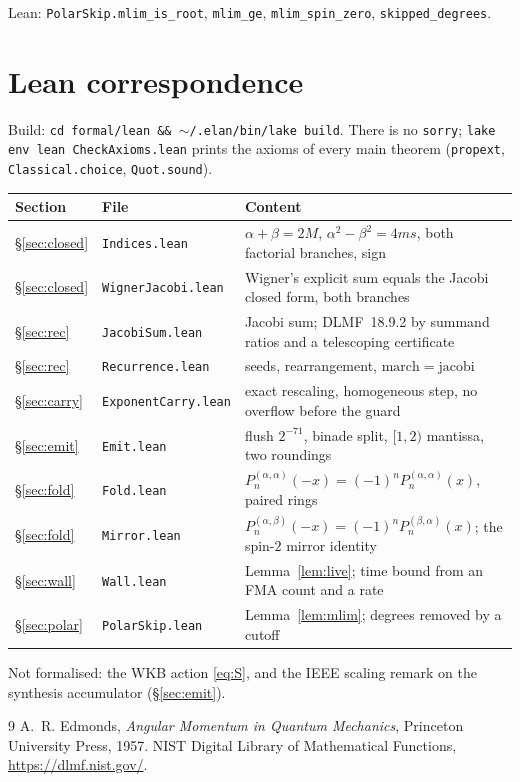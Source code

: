 \documentclass[11pt,a4paper]{article}
\numberwithin{equation}{section}
\begin{document}
Lean: \texttt{PolarSkip.mlim\_is\_root}, \texttt{mlim\_ge},
\texttt{mlim\_spin\_zero}, \texttt{skipped\_degrees}.

\appendix
\section{Lean correspondence}
\label{app:lean}

Build: \texttt{cd formal/lean \&\& $\sim$/.elan/bin/lake build}.
There is no \texttt{sorry}; \texttt{lake env lean CheckAxioms.lean} prints the
axioms of every main theorem (\texttt{propext}, \texttt{Classical.choice},
\texttt{Quot.sound}).

\begin{center}
\small
\begin{tabular}{@{}llp{7.4cm}@{}}
\toprule
Section & File & Content \\
\midrule
\S\ref{sec:closed}
  & \texttt{Indices.lean}
  & $\alpha+\beta=2M$, $\alpha^2-\beta^2=4ms$, both factorial branches, sign \\
\S\ref{sec:closed}
  & \texttt{WignerJacobi.lean}
  & Wigner's explicit sum equals the Jacobi closed form, both branches \\
\S\ref{sec:rec}
  & \texttt{JacobiSum.lean}
  & Jacobi sum; DLMF~18.9.2 by summand ratios and a telescoping certificate \\
\S\ref{sec:rec}
  & \texttt{Recurrence.lean}
  & seeds, rearrangement, $\mathrm{march}=\mathrm{jacobi}$ \\
\S\ref{sec:carry}
  & \texttt{ExponentCarry.lean}
  & exact rescaling, homogeneous step, no overflow before the guard \\
\S\ref{sec:emit}
  & \texttt{Emit.lean}
  & flush $2^{-71}$, binade split, $[1,2)$ mantissa, two roundings \\
\S\ref{sec:fold}
  & \texttt{Fold.lean}
  & $P_n^{(\alpha,\alpha)}(-x)=(-1)^n P_n^{(\alpha,\alpha)}(x)$, paired rings \\
\S\ref{sec:fold}
  & \texttt{Mirror.lean}
  & $P_n^{(\alpha,\beta)}(-x)=(-1)^nP_n^{(\beta,\alpha)}(x)$; the spin-$2$ mirror identity \\
\S\ref{sec:wall}
  & \texttt{Wall.lean}
  & Lemma~\ref{lem:live}; time bound from an FMA count and a rate \\
\S\ref{sec:polar}
  & \texttt{PolarSkip.lean}
  & Lemma~\ref{lem:mlim}; degrees removed by a cutoff \\
\bottomrule
\end{tabular}
\end{center}

Not formalised: the WKB action \eqref{eq:S}, and the IEEE scaling remark on
the synthesis accumulator (\S\ref{sec:emit}).

\begin{thebibliography}{9}
A.~R. Edmonds, \emph{Angular Momentum in Quantum Mechanics},
Princeton University Press, 1957.
NIST Digital Library of Mathematical Functions,
\url{https://dlmf.nist.gov/}.
\end{thebibliography}
\end{document}
